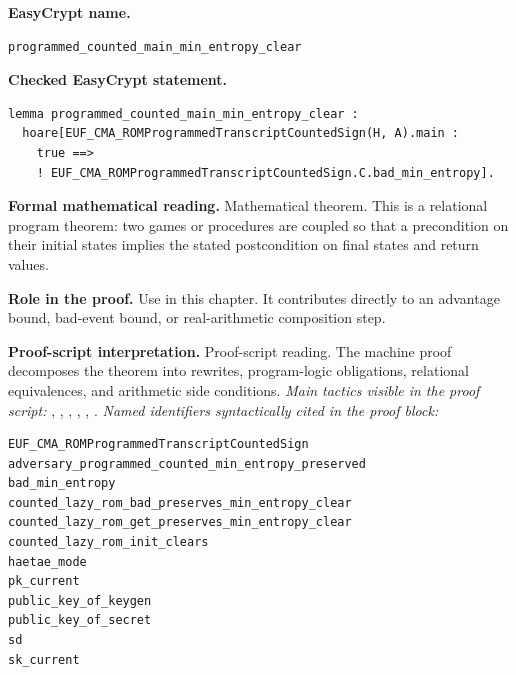 \begin{formaltheorem}
\noindent\textbf{EasyCrypt name.}
\begin{lstlisting}[language=EasyCrypt,basicstyle=\ttfamily\scriptsize]
programmed_counted_main_min_entropy_clear
\end{lstlisting}
\noindent\textbf{Checked EasyCrypt statement.}
\begin{lstlisting}[language=EasyCrypt,basicstyle=\ttfamily\scriptsize]
lemma programmed_counted_main_min_entropy_clear :
  hoare[EUF_CMA_ROMProgrammedTranscriptCountedSign(H, A).main :
    true ==>
    ! EUF_CMA_ROMProgrammedTranscriptCountedSign.C.bad_min_entropy].
\end{lstlisting}
\noindent\textbf{Formal mathematical reading.}
Mathematical theorem. This is a relational program theorem: two games or procedures are coupled so that a precondition on their initial states implies the stated postcondition on final states and return values.

\noindent\textbf{Role in the proof.}
Use in this chapter. It contributes directly to an advantage bound, bad-event bound, or real-arithmetic composition step.

\noindent\textbf{Proof-script interpretation.}
Proof-script reading. The machine proof decomposes the theorem into rewrites, program-logic obligations, relational equivalences, and arithmetic side conditions.
\emph{Main tactics visible in the proof script:} , , , , , .
\emph{Named identifiers syntactically cited in the proof block:}
\begin{lstlisting}[language=EasyCrypt,basicstyle=\ttfamily\scriptsize]
EUF_CMA_ROMProgrammedTranscriptCountedSign
adversary_programmed_counted_min_entropy_preserved
bad_min_entropy
counted_lazy_rom_bad_preserves_min_entropy_clear
counted_lazy_rom_get_preserves_min_entropy_clear
counted_lazy_rom_init_clears
haetae_mode
pk_current
public_key_of_keygen
public_key_of_secret
sd
sk_current
\end{lstlisting}

\end{formaltheorem}

